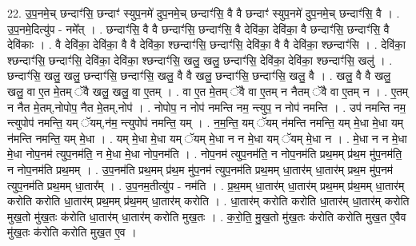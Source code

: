 \documentclass[17pt]{extarticle}
\begin{document}
22. उ॒प॒नमे॒च् छन्दाꣳ॑सि॒ छन्दाꣳ॑ स्युप॒नमे॑ दुप॒नमे॒च् छन्दाꣳ॑सि॒ वै वै छन्दाꣳ॑ स्युप॒नमे॑ दुप॒नमे॒च् छन्दाꣳ॑सि॒ वै । . उ॒प॒नमे॒दित्यु॑प - नमे᳚त् । . छन्दाꣳ॑सि॒ वै वै छन्दाꣳ॑सि॒ छन्दाꣳ॑सि॒ वै देवि॑का॒ देवि॑का॒ वै छन्दाꣳ॑सि॒ छन्दाꣳ॑सि॒ वै देवि॑काः । . वै देवि॑का॒ देवि॑का॒ वै वै देवि॑का॒ श्छन्दाꣳ॑सि॒ छन्दाꣳ॑सि॒ देवि॑का॒ वै वै देवि॑का॒ श्छन्दाꣳ॑सि । . देवि॑का॒ श्छन्दाꣳ॑सि॒ छन्दाꣳ॑सि॒ देवि॑का॒ देवि॑का॒ श्छन्दाꣳ॑सि॒ खलु॒ खलु॒ छन्दाꣳ॑सि॒ देवि॑का॒ देवि॑का॒ श्छन्दाꣳ॑सि॒ खलु॑ । . छन्दाꣳ॑सि॒ खलु॒ खलु॒ छन्दाꣳ॑सि॒ छन्दाꣳ॑सि॒ खलु॒ वै वै खलु॒ छन्दाꣳ॑सि॒ छन्दाꣳ॑सि॒ खलु॒ वै । . खलु॒ वै वै खलु॒ खलु॒ वा ए॒त मे॒तम् ॅवै खलु॒ खलु॒ वा ए॒तम् । . वा ए॒त मे॒तम् ॅवै वा ए॒तम् न नैतम् ॅवै वा ए॒तम् न । . ए॒तम् न नैत मे॒तम्,नोपोप॒ नैत मे॒तम्,नोप॑ । . नोपोप॒ न नोप॑ नमन्ति नम॒ न्त्युप॒ न नोप॑ नमन्ति । . उप॑ नमन्ति नम॒ न्त्युपोप॑ नमन्ति॒ यम् ॅयम्,न॑म॒ न्त्युपोप॑ नमन्ति॒ यम् । . न॒म॒न्ति॒ यम् ॅयम् न॑मन्ति नमन्ति॒ यम् मे॒धा मे॒धा यम् न॑मन्ति नमन्ति॒ यम् मे॒धा । . यम् मे॒धा मे॒धा यम् ॅयम् मे॒धा न न मे॒धा यम् ॅयम् मे॒धा न । . मे॒धा न न मे॒धा मे॒धा नोप॒नम॑ त्युप॒नम॑ति॒ न मे॒धा मे॒धा नोप॒नम॑ति । . नोप॒नम॑ त्युप॒नम॑ति॒ न नोप॒नम॑ति प्रथ॒मम् प्र॑थ॒म मु॑प॒नम॑ति॒ न नोप॒नम॑ति प्रथ॒मम् । . उ॒प॒नम॑ति प्रथ॒मम् प्र॑थ॒म मु॑प॒नम॑ त्युप॒नम॑ति प्रथ॒मम् धा॒तार॑म् धा॒तार॑म् प्रथ॒म मु॑प॒नम॑ त्युप॒नम॑ति प्रथ॒मम् धा॒तार᳚म् । . उ॒प॒नम॒तीत्यु॑प - नम॑ति । . प्र॒थ॒मम् धा॒तार॑म् धा॒तार॑म् प्रथ॒मम् प्र॑थ॒मम् धा॒तार॑म् करोति करोति धा॒तार॑म् 
प्रथ॒मम् प्र॑थ॒मम् धा॒तार॑म् करोति । . धा॒तार॑म् करोति करोति धा॒तार॑म् धा॒तार॑म् करोति मुख॒तो मु॑ख॒तः क॑रोति धा॒तार॑म् धा॒तार॑म् करोति मुख॒तः । . क॒रो॒ति॒ मु॒ख॒तो मु॑ख॒तः क॑रोति करोति मुख॒त ए॒वैव मु॑ख॒तः क॑रोति करोति मुख॒त ए॒व । \newline
\end{document}

